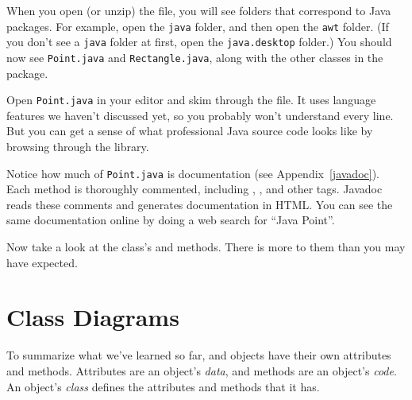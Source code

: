 When you open (or unzip) the file, you will see folders that correspond to Java packages.
For example, open the {\tt java} folder, and then open the {\tt awt} folder.
(If you don't see a {\tt java} folder at first, open the {\tt java.desktop} folder.)
You should now see {\tt Point.java} and {\tt Rectangle.java}, along with the other classes in the  package.

Open {\tt Point.java} in your editor and skim through the file.
It uses language features we haven't discussed yet, so you probably won't understand every line.
But you can get a sense of what professional Java source code looks like by browsing through the library.


Notice how much of {\tt Point.java} is documentation (see Appendix~\ref{javadoc}).
Each method is thoroughly commented, including , , and other tags.
Javadoc reads these comments and generates documentation in HTML.
You can see the same documentation online by doing a web search for ``Java Point''.

Now take a look at the  class's  and  methods.
There is more to them than you may have expected.






\section{Class Diagrams}
\label{UML}

To summarize what we've learned so far,  and  objects have their own attributes and methods.
Attributes are an object's {\em data}, and methods are an object's {\em code}.
An object's {\em class} defines the attributes and methods that it has.


